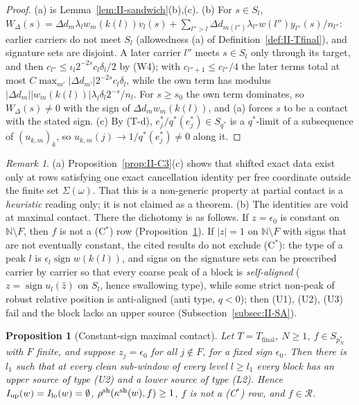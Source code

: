 \documentclass[10pt]{amsart}
\newtheorem{proposition}[theorem]{Proposition}
\theoremstyle{definition}
\theoremstyle{remark}
\newtheorem{remark}[theorem]{Remark}
\newcommand{\sgn}{\operatorname{sign}}
\newcommand{\N}{\mathbb N}
\newcommand{\Rec}{\mathcal R}
\newcommand{\zh}{\hat z}
\begin{document}
\begin{proof}
(a) is Lemma~\ref{lem:II-sandwich}(b),(c).  (b) For $s\in S_l$, $W_\Delta(s)=
\Delta d_m\lambda_lw_m(k(l))v_l(s)+\sum_{l''>l}\Delta d_{m(l'')}\lambda_{l''}
w(l'')y_{l''}(s)/n_{l''}$: earlier carriers do not meet $S_l$ (allowedness
(a) of Definition~\ref{def:II-Tfinal}), and signature sets are disjoint.  A
later carrier $l''$ meets $s\in S_l$ only through its target, and then
$c_{l''}\le\iota_l2^{-2s}c_l\delta_l/2$ by (W4); with $c_{l''+1}\le c_{l''}/4$
the later terms total at most $C\max_{m'}|\Delta d_{m'}|2^{-2s}c_l\delta_l$,
while the own term has modulus $|\Delta d_m||w_m(k(l))|\lambda_l\delta_l2^{-s}/
n_l$.  For $s\ge s_0$ the own term dominates, so $W_\Delta(s)\ne0$ with the
sign of $\Delta d_m w_m(k(l))$, and (a) forces $s$ to be a contact with the
stated sign.  (c) By (T-d), $e_j^*/q^*(e_j^*)\in S_{q^*}$ is a $q^*$-limit of
a subsequence of $(u_{k,m})_k$, so $u_{k,m}(j)\to1/q^*(e_j^*)\ne0$ along it.
\end{proof}

\begin{remark}\label{rem:II-C3}
(a) Proposition~\ref{prop:II-C3}(c) shows that shifted exact data exist only
at rows satisfying one exact cancellation identity per free coordinate
outside the finite set $\Sigma(\omega)$.  That this is a non-generic
property at partial contact is a \emph{heuristic} reading only; it is not
claimed as a theorem.
(b) The identities are void at maximal contact.  There the dichotomy is as
follows.  If $z=\epsilon_0$ is constant on $\N\setminus F$, then $f$ is not a
(C$^*$) row (Proposition~\ref{prop:II-constcontact}).  If $|z|=1$ on
$\N\setminus F$ with signs that are not eventually constant, the cited
results do not exclude (C$^*$): the type of a peak $l$ is $\epsilon_l\sgn
w(k(l))$, and signs on the signature sets can be prescribed carrier by
carrier so that every coarse peak of a block is \emph{self-aligned}
($z=\sgn u_l(\zh)$ on $S_l$, hence swallowing type), while some strict
non-peak of robust relative position is anti-aligned (anti type, $q<0$);
then (U1), (U2), (U3) fail and the block lacks an upper source
(Subsection~\ref{subsec:II-SA}).
\end{remark}

\begin{proposition}[Constant-sign maximal contact]\label{prop:II-constcontact}
Let $T=T_{\mathrm{final}}$, $N\ge1$, $f\in S_{p_N^*}$ with
$F$ finite, and suppose $z_j=\epsilon_0$ for all $j\notin F$, for a fixed
sign $\epsilon_0$.  Then there is $l_1$ such that at every clean sub-window
of every level $l\ge l_1$ every block has an upper source of type
\textup{(U2)} and a lower source of type \textup{(L2)}.  Hence
$I_{\rm up}(w)=I_{\rm lo}(w)=\emptyset$, $\rho^{\rm sh}(\kappa^{\rm sh}(w),f)\ge1$,
$f$ is not a \textup{(C$^*$)} row, and $f\in\Rec$.
\end{proposition}
\end{document}
